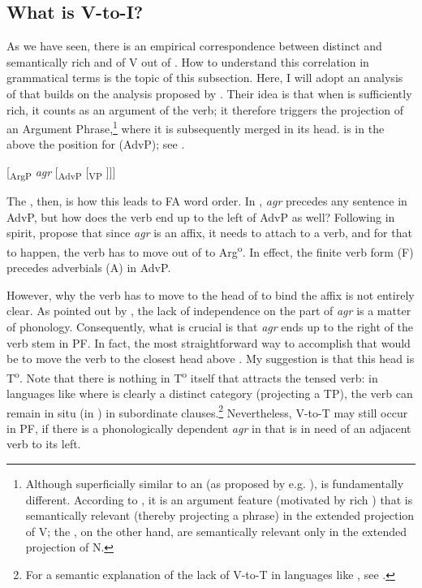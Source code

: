 \documentclass[output=paper,colorlinks,citecolor=brown,draft,draftmode]{langscibook}
\begin{document}
\subsection{What is V-to-I?}\label{sec:petzell:5.1}


As we have seen, there is an empirical correspondence between distinct and semantically rich  and  of V out of . How to understand this correlation in grammatical terms is the topic of this subsection. Here, I will adopt an analysis of  that builds on the analysis proposed by \citet{KoenemanZeijlstra2014}. Their idea is that when  is sufficiently rich, it counts as an argument of the verb; it therefore triggers the projection of an Argument Phrase,\footnote{Although superficially similar to an  (as proposed by e.g. \citealt{Chomsky1995}),  is fundamentally different. According to \citet[600]{KoenemanZeijlstra2014}, it is an argument feature (motivated by rich ) that is semantically relevant (thereby projecting a phrase) in the extended projection of V; the , on the other hand, are semantically relevant only in the extended projection of N.} where it is subsequently merged in its head.  is in the  above the position for  (AdvP); see .


\ea\label{ex:petzell:30}
[\textsubscript{ArgP} \textit{agr} [\textsubscript{AdvP} [\textsubscript{VP} ]]]\\
\z

The , then, is how this leads to FA word order. In , \textit{agr} precedes any sentence  in AdvP, but how does the verb end up to the left of AdvP as well? Following \citet{Rohrbacher1999} in spirit, \citet[601]{KoenemanZeijlstra2014} propose that since \textit{agr} is an affix, it needs to attach to a verb, and for that to happen, the verb has to move out of  to Arg\textsuperscript{o}. In effect, the finite verb form (F) precedes adverbials (A) in AdvP.



However, why the verb has to move to the head of  to bind the affix is not entirely clear. As pointed out by \citet{KoenemanZeijlstra2014}, the lack of independence on the part of \textit{agr} is a matter of phonology. Consequently, what is crucial is that \textit{agr} ends up to the right of the verb stem in PF. In fact, the most straightforward way to accomplish that would be to move the verb to the closest head above . My suggestion is that this head is T\textsuperscript{o}. Note that there is nothing in T\textsuperscript{o} itself that attracts the tensed verb: in languages like  where  is clearly a distinct category (projecting a TP), the verb can remain in situ (in ) in subordinate clauses.\footnote{For a semantic explanation of the lack of V-to-T in languages like , see \citet{Zeijlstra2012}.}  Nevertheless, V-to-T may still occur in PF, if there is a phonologically dependent \textit{agr} in  that is in need of an adjacent verb to its left.
\end{document}
